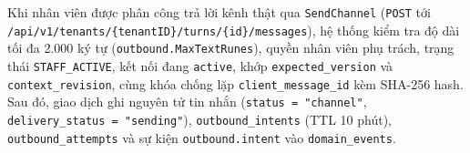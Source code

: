 Khi nhân viên được phân công trả lời kênh thật qua \texttt{SendChannel} (\texttt{POST} tới \texttt{/api/\hspace{0pt}v1/\hspace{0pt}tenants/\hspace{0pt}\{tenantID\}/\hspace{0pt}turns/\hspace{0pt}\{id\}/\hspace{0pt}messages}), hệ thống kiểm tra độ dài tối đa
2.000 ký tự (\texttt{outbound.\hspace{0pt}MaxTextRunes}), quyền nhân viên phụ trách, trạng thái \texttt{STAFF\_\hspace{0pt}ACTIVE}, kết nối đang \texttt{active}, khớp \texttt{expected\_\hspace{0pt}version} và
\texttt{context\_\hspace{0pt}revision}, cùng khóa chống lặp \texttt{client\_\hspace{0pt}message\_\hspace{0pt}id} kèm SHA-256 hash.
Sau đó, giao dịch ghi nguyên tử tin nhắn (\texttt{status = "channel"}, \texttt{delivery\_\hspace{0pt}status = "sending"}), \texttt{outbound\_\hspace{0pt}intents} (TTL 10 phút),
\texttt{outbound\_\hspace{0pt}attempts} và sự kiện \texttt{outbound.\hspace{0pt}intent} vào \texttt{domain\_\hspace{0pt}events}.

